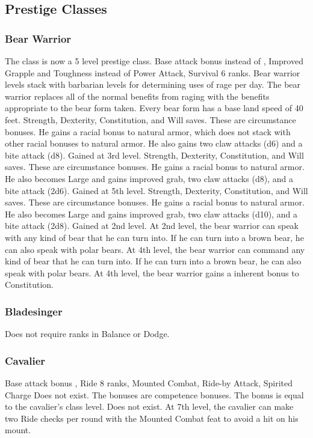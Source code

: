 \subsection{Prestige Classes}
\subsubsection{Bear Warrior}
The class is now a 5 level prestige class.
 Base attack bonus  instead of , Improved Grapple and Toughness instead of Power Attack, Survival 6 ranks.
 Bear warrior levels stack with barbarian levels for determining uses of rage per day.
 The bear warrior replaces all of the normal benefits from raging with the benefits appropriate to the bear form taken. Every bear form has a base land speed of 40 feet.
  Strength,  Dexterity,  Constitution, and  Will saves. These are circumstance bonuses. He gains a  racial bonus to natural armor, which does not stack with other racial bonuses to natural armor. He also gains two claw attacks (d6) and a bite attack (d8).
 Gained at 3rd level.  Strength,  Dexterity,  Constitution, and  Will saves. These are circumstance bonuses. He gains a  racial bonus to natural armor. He also becomes Large and gains improved grab, two claw attacks (d8), and a bite attack (2d6).
 Gained at 5th level.  Strength,  Dexterity,  Constitution, and  Will saves. These are circumstance bonuses. He gains a  racial bonus to natural armor. He also becomes Large and gains improved grab, two claw attacks (d10), and a bite attack (2d8).
 Gained at 2nd level.
 At 2nd level, the bear warrior can speak with any kind of bear that he can turn into. If he can turn into a brown bear, he can also speak with polar bears.
 At 4th level, the bear warrior can command any kind of bear that he can turn into. If he can turn into a brown bear, he can also speak with polar bears.
 At 4th level, the bear warrior gains a  inherent bonus to Constitution.
\subsubsection{Bladesinger}
 Does not require ranks in Balance or Dodge.
\subsubsection{Cavalier}
 Base attack bonus , Ride 8 ranks, Mounted Combat, Ride-by Attack, Spirited Charge
 Does not exist.
 The bonuses are competence bonuses.
 The bonus is equal to the cavalier's class level.
 Does not exist.
 At 7th level, the cavalier can make two Ride checks per round with the Mounted Combat feat to avoid a hit on his mount.
